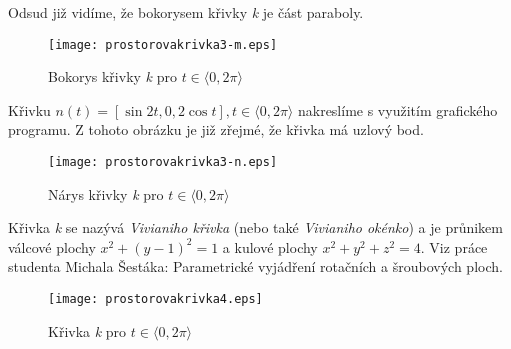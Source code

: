 Odsud již vidíme, že bokorysem křivky \textit{k} je část paraboly. \\
\begin{figure}[H]
	\centering
	\texttt{[image: prostorovakrivka3-m.eps]}
	\caption{Bokorys křivky \textit{k} pro $t \in \langle0, 2\pi\rangle$}
	\label{overflow}
\end{figure}
Křivku $n(t) = [\sin{2t}, 0, 2\cos{t}], t \in \langle0, 2\pi\rangle$ nakreslíme s využitím grafického programu.
Z tohoto obrázku je již zřejmé, že křivka má uzlový bod. \\
\begin{figure}[H]
	\centering
	\texttt{[image: prostorovakrivka3-n.eps]}
	\caption{Nárys křivky \textit{k} pro $t \in \langle0, 2\pi\rangle$}
	\label{overflow}
\end{figure}
Křivka \textit{k} se nazývá \textit{Vivianiho křivka} (nebo také \textit{Vivianiho okénko}) a je průnikem
válcové plochy $x^2+(y-1)^2=1$ a kulové plochy $x^2+y^2+z^2=4$. Viz práce studenta Michala Šestáka: Parametrické
vyjádření rotačních a šroubových ploch.
\begin{figure}[H]
	\centering
	\texttt{[image: prostorovakrivka4.eps]}
	\caption{Křivka \textit{k} pro $t \in \langle0, 2\pi\rangle$}
	\label{overflow}
\end{figure} 
